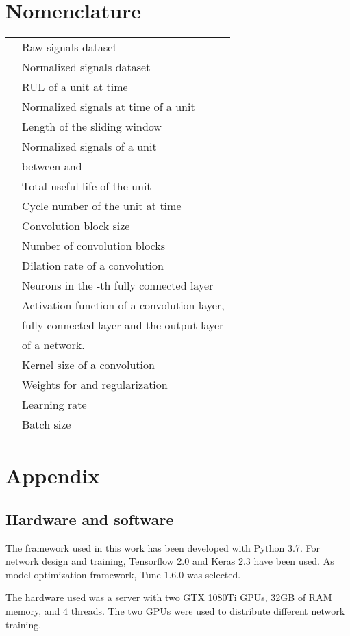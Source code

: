 \documentclass[PHM, 2021]{PHMSociety}
\begin{document}
\section*{Nomenclature}

\begin{tabular}{ l  l }
				& Raw signals dataset \\
		& Normalized signals dataset\\
		    & RUL of a unit  at time  \\
				& Normalized signals at time  of a unit  \\
	                   & Length of the sliding window \\
	     & Normalized signals of a unit  \\
	\:                      & between  and  \\
                     & Total useful life of the unit  \\
	                 & Cycle number of the unit  at time      \\ 
	                  & Convolution block size \\
	                  & Number of convolution blocks \\
	              & Dilation rate of a convolution \\
	                  & Neurons in the -th fully connected layer\\
	 & Activation function of a convolution layer, \\  
	\:                                            & fully connected layer and the output layer \\ 
	\:                                            & of a network. \\
	                   & Kernel size of a convolution \\
	                   & Weights for  and  regularization  \\
	                   & Learning rate  \\
	                   & Batch size \\
 \end{tabular}








\section*{Appendix}

\subsection*{Hardware and software}

The framework used in this work has been developed with Python 3.7. For network design and training, Tensorflow 2.0 \cite{abadi2016tensorflow} and Keras 2.3 \cite{gulli2017deep} have been used. As model optimization framework, Tune 1.6.0 \cite{liaw2018tune} was selected.

The hardware used was a server with two GTX 1080Ti GPUs, 32GB of RAM memory, and 4 threads. The two GPUs were used to distribute different network training.
\end{document}
